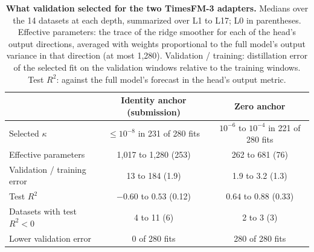 \begin{table}[t]
\centering
\caption{\textbf{What validation selected for the two TimesFM-3 adapters.} Medians over the 14 datasets at each depth, summarized over L1 to L17; L0 in parentheses. Effective parameters: the trace of the ridge smoother for each of the head's output directions, averaged with weights proportional to the full model's output variance in that direction (at most 1,280). Validation / training: distillation error of the selected fit on the validation windows relative to the training windows. Test $R^2$: against the full model's forecast in the head's output metric.}
\vspace{4pt}
\label{tab:timesfm3_ridge_fit}
\small
\setlength{\tabcolsep}{5pt}
\begin{tabular}{@{}lcc@{}}
\toprule
& Identity anchor (submission) & Zero anchor \\
\midrule
Selected $\kappa$ & $\le10^{-8}$ in 231 of 280 fits & $10^{-6}$ to $10^{-4}$ in 221 of 280 fits \\
Effective parameters & 1,017 to 1,280 (253) & 262 to 681 (76) \\
Validation / training error & 13 to 184 (1.9) & 1.9 to 3.2 (1.3) \\
Test $R^2$ & $-0.60$ to $0.53$ (0.12) & $0.64$ to $0.88$ (0.33) \\
Datasets with test $R^2<0$ & 4 to 11 (6) & 2 to 3 (3) \\
Lower validation error & 0 of 280 fits & 280 of 280 fits \\
\bottomrule
\end{tabular}
\end{table}
